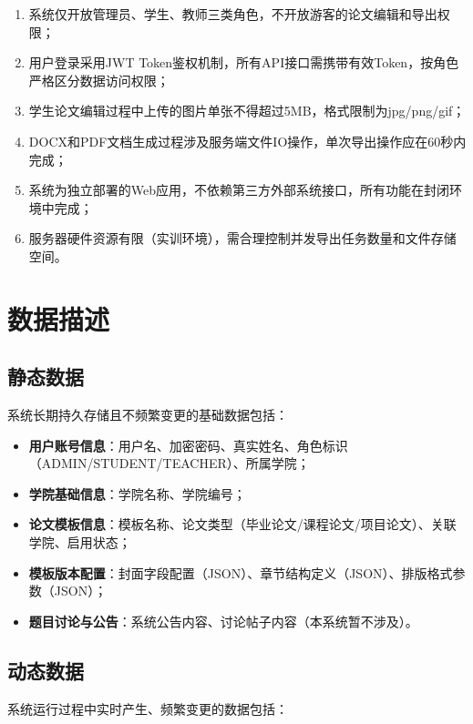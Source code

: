 \documentclass{../../softeng}
\begin{document}
\begin{enumerate}
    \item 系统仅开放管理员、学生、教师三类角色，不开放游客的论文编辑和导出权限；
    \item 用户登录采用JWT Token鉴权机制，所有API接口需携带有效Token，按角色严格区分数据访问权限；
    \item 学生论文编辑过程中上传的图片单张不得超过5MB，格式限制为jpg/png/gif；
    \item DOCX和PDF文档生成过程涉及服务端文件IO操作，单次导出操作应在60秒内完成；
    \item 系统为独立部署的Web应用，不依赖第三方外部系统接口，所有功能在封闭环境中完成；
    \item 服务器硬件资源有限（实训环境），需合理控制并发导出任务数量和文件存储空间。
\end{enumerate}

\section{数据描述}

\subsection{静态数据}

系统长期持久存储且不频繁变更的基础数据包括：

\begin{itemize}
    \item \textbf{用户账号信息}：用户名、加密密码、真实姓名、角色标识（ADMIN/STUDENT/TEACHER）、所属学院；
    \item \textbf{学院基础信息}：学院名称、学院编号；
    \item \textbf{论文模板信息}：模板名称、论文类型（毕业论文/课程论文/项目论文）、关联学院、启用状态；
    \item \textbf{模板版本配置}：封面字段配置（JSON）、章节结构定义（JSON）、排版格式参数（JSON）；
    \item \textbf{题目讨论与公告}：系统公告内容、讨论帖子内容（本系统暂不涉及）。
\end{itemize}

\subsection{动态数据}

系统运行过程中实时产生、频繁变更的数据包括：
\end{document}
